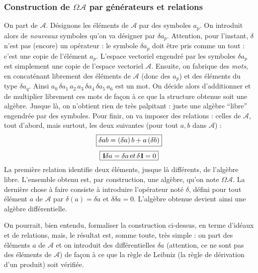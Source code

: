 	\subsubsection{Construction de $\Omega{\mathcal A}$ par g\'en\'erateurs 
	et relations}  \label{sec: Omega}
	On part de ${\mathcal A}$. D\'esignons les \'el\'ements de ${\mathcal A}$ 
	par des symboles $a_{p}$. On introduit alors de {\it nouveaux} 
	symboles qu'on va d\'esigner par $\delta a_{p}$. Attention, pour 
	l'instant, $\delta$ n'est pas (encore) un op\'erateur : le symbole $\delta 
	a_{p}$ doit \^etre pris comme un tout : c'est une copie de l'\'el\'ement 
	$a_{p}$. L'espace vectoriel engendr\'e par les symboles $\delta a_{p}$ est 
	simplement une copie de l'espace vectoriel ${\mathcal A}$. Ensuite, on 
	fabrique des {\sl mots}, en concat\'enant librement des \'el\'ements de ${\mathcal 
	A}$ (donc des $a_{p}$)  et des \'el\'ements du type $\delta a_{q}$. 
	Ainsi $a_{0} \, \delta a_{1} \, a_{2} \, a_{3} \, \delta a_{4}\, 
	\delta a_{5} \, a_{6}$ est un mot. On d\'ecide alors d'additionner et 
	de multiplier librement ces mots de fa\c con \`a ce que la structure 
	obtenue soit une alg\`ebre. Jusque l\`a, on n'obtient rien de tr\`es 
	palpitant : juste une alg\`ebre ``libre'' engendr\'ee par des symboles.
	Pour finir, on va imposer des relations : celles de ${\mathcal A}$, 
	tout d'abord, mais surtout, les deux suivantes (pour tout $a,b$ 
	dans ${\mathcal A}$) :
	$$
	\mbox{\fbox{$
	\delta ab = (\delta a) \,  b + a \, (\delta b)
	$}}
	$$
	$$  
	\mbox{\fbox{$
	 \mbox{\rm 1}\hskip-3pt \mbox{\rm l} \delta a = \delta a \, {\mbox et } 
	\, \delta \mbox{\rm 1}\hskip-3pt \mbox{\rm l} = 0
	$}}
	$$
	La premi\`ere relation identifie deux \'el\'ements, jusque l\`a diff\'erents, de 
	l'alg\`ebre libre. L'ensemble obtenu est, par construction, une alg\`ebre, qu'on note 
	$\Omega{\mathcal A}$. La derni\`ere chose \`a faire consiste \`a introduire
	l'op\'erateur not\'e $\delta$,  d\'efini pour tout \'el\'ement $a$ de ${\mathcal 
	A}$ par $\delta(a) = \delta a$ et $\delta \delta a = 0$. L'alg\`ebre 
	obtenue devient ainsi une alg\`ebre diff\'erentielle.
	
	On pourrait, bien entendu, formaliser la construction ci-dessus, en 
	terme d'id\'eaux et de relations, mais, le r\'esultat est, somme toute, 
	tr\`es simple : on part des \'el\'ements $a$ de ${\mathcal A}$ et on 
	introduit des diff\'erentielles $\delta a$ (attention, ce ne sont pas 
	des \'el\'ements de ${\mathcal A}$) de fa\c con \`a ce que la r\`egle de 
	Leibniz (la r\`egle de d\'erivation d'un produit) soit v\'erifi\'ee.
	
